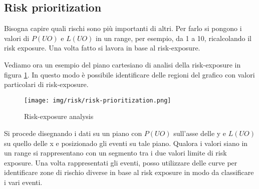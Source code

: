 \subsection{Risk prioritization}
Bisogna capire quali rischi sono più importanti di altri. Per farlo si pongono i
valori di $P(UO)$ e $L(UO)$ in un range, per esempio, da 1 a 10, ricalcolando il
risk exposure. Una volta fatto si lavora in base al risk-exposure.
\begin{esempio}
    Vediamo ora un esempio del piano cartesiano di analisi della risk-exposure in
    figura \ref{fig:risk-exposure-analysis}. In questo modo è possibile identificare
    delle regioni del grafico con valori particolari di risk-exposure.
    \begin{figure}[!ht]
        \centering
        \texttt{[image: img/risk/risk-prioritization.png]}
        \caption{Risk-exposure analysis}
        \label{fig:risk-exposure-analysis}
    \end{figure}
\end{esempio}
Si procede disegnando i dati su un piano con $P(UO)$ sull'asse delle y e $L(UO)$
su quello delle x e posizionado gli eventi su tale piano. Qualora i valori siano
in un range si rappresentano con un segmento tra i due valori limite di risk exposure.
Una volta rappresentati gli eventi, posso utilizzare delle curve per identificare
zone di rischio diverse in base al risk exposure in modo da classificare i vari eventi.
